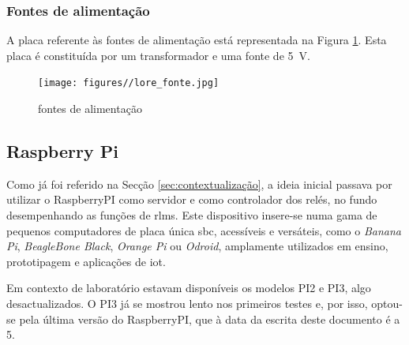 \subsubsection{Fontes de alimentação}
A placa referente às fontes de alimentação está representada na Figura \ref{fig:placartransformador}. Esta placa é constituída por um transformador e uma fonte de \SI{5}{\volt}.

\begin{figure}[hbtp]
	\centering
	\texttt{[image: figures//lore\_fonte.jpg]}
	\caption{ fontes de alimentação}
	\label{fig:placartransformador}
\end{figure}

\subsection{Raspberry Pi}
\label{sec:RaspberryPI}
Como já foi referido na Secção \ref{sec:contextualização}, a ideia inicial passava por utilizar o \gls{RaspberryPI} como servidor e como controlador dos relés, no fundo desempenhando as funções de \acrshort{rlms}. Este dispositivo insere-se numa gama de pequenos computadores de placa única \gls{sbc}, acessíveis e versáteis, como o \textit{Banana Pi}, \textit{BeagleBone Black}, \textit{Orange Pi} ou \textit{Odroid}, amplamente utilizados em ensino, prototipagem e aplicações de \acrshort{iot}. 

Em contexto de laboratório estavam disponíveis os modelos PI2 e PI3, algo desactualizados. O PI3 já se mostrou lento nos primeiros testes e, por isso, optou-se pela última versão do \gls{RaspberryPI}, que à data da escrita deste documento é a 5.

